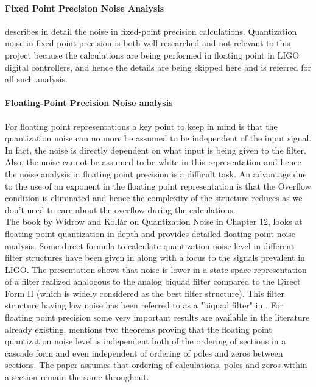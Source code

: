 \documentclass[colorlinks=true,pdfstartview=FitV,linkcolor=blue,
            citecolor=red,urlcolor=magenta]{ligodoc}
\begin{document}
	\paragraph{Fixed Point Precision Noise Analysis}
	\cite{Oppenheim} describes in detail the noise in fixed-point precision calculations. Quantization noise in fixed point precision is both well researched and not relevant to this project because the calculations are being performed in floating point in LIGO digital controllers, and hence the details are being skipped here and \cite{Oppenheim} is referred for all such analysis.
	\paragraph{Floating-Point Precision Noise analysis}
For floating point representations a key point to keep in mind is that the quantization noise can no more be assumed to be independent of the input signal. In fact, the noise is directly dependent on what input is being given to the filter. Also, the noise cannot be assumed to be white in this representation and hence the noise analysis in floating point precision is a difficult task. An advantage due to the use of an exponent in the floating point representation is that the Overflow condition is eliminated and hence the complexity of the structure reduces as we don't need to care about the overflow during the calculations.\\
The book by Widrow and Koll\'ar on Quantization Noise in Chapter 12, \cite{Kollar} looks at floating point quantization in depth and provides detailed floating-point noise analysis. Some direct formula to calculate quantization noise level in different filter structures have been given in \cite{Matts} along with a focus to the signals prevalent in LIGO. The presentation \cite{Matts} shows that noise is lower in a state space representation of a filter realized analogous to the analog biquad filter compared to the Direct Form II (which is widely considered as the best filter structure). This filter structure having low noise has been referred to as a "biquad filter" in \cite{Matts}.
For floating point precision some very important results are available in the literature already existing. \cite{Zeng} mentions two theorems proving that the floating point quantization noise level is independent both of the ordering of sections in a cascade form and even independent of ordering of poles and zeros between sections. The paper assumes that ordering of calculations, poles and zeros within a section remain the same throughout.
\end{document}

